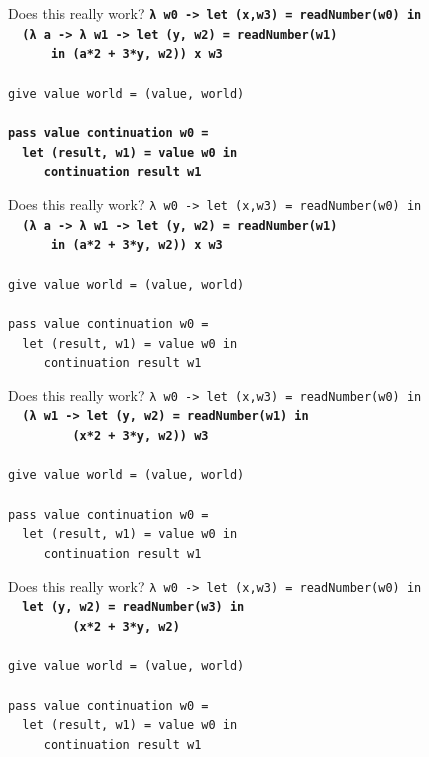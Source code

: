 \documentclass{beamer}
\begin{document}
\begin{frame}{Does this really work?}
  \texttt{\textbf{λ w0 -> let (x,w3) = readNumber(w0) in\\
      \ \ (λ a -> λ w1 -> let (y, w2) = readNumber(w1) \\
      \ \ \ \ \ \ in (a*2 + 3*y, w2)) x w3}\\
    \ \\
    give value world = (value, world) \\
    \ \\
    \textbf{pass value continuation w0 = \\
      \ \ let (result, w1) = value w0 in \\
      \ \ \ \ \ continuation result w1}
  }
\end{frame}

\begin{frame}{Does this really work?}
  \texttt{λ w0 -> let (x,w3) = readNumber(w0) in\\
    \ \ \textbf{(λ a -> λ w1 -> let (y, w2) = readNumber(w1)\\
      \ \ \ \ \ \ in (a*2 + 3*y, w2)) x w3}\\
    \ \\
    give value world = (value, world) \\
    \ \\
    pass value continuation w0 = \\
    \ \ let (result, w1) = value w0 in \\
    \ \ \ \ \ continuation result w1
  }
\end{frame}

\begin{frame}{Does this really work?}
  \texttt{λ w0 -> let (x,w3) = readNumber(w0) in\\
    \ \ \textbf{(λ w1 -> let (y, w2) = readNumber(w1) in\\
      \ \ \ \ \ \ \ \ \ (x*2 + 3*y, w2)) w3}\\
    \ \\
    give value world = (value, world) \\
    \ \\
    pass value continuation w0 = \\
    \ \ let (result, w1) = value w0 in \\
    \ \ \ \ \ continuation result w1
  }
\end{frame}

\begin{frame}{Does this really work?}
  \texttt{λ w0 -> let (x,w3) = readNumber(w0) in\\
    \ \ \textbf{let (y, w2) = readNumber(w3) in\\
      \ \ \ \ \ \ \ \ \ (x*2 + 3*y, w2)}\\
    \ \\
    give value world = (value, world) \\
    \ \\
    pass value continuation w0 = \\
    \ \ let (result, w1) = value w0 in \\
    \ \ \ \ \ continuation result w1
  }
\end{frame}
\end{document}
